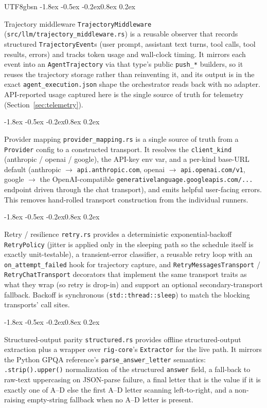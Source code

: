 \documentclass{article}
\makeatletter
\renewcommand{\subsection}{\@startsection{subsection}{2}{\z@}%
  {-1.8ex \@plus -0.5ex \@minus -0.2ex}{0.8ex \@plus 0.2ex}%
  {\normalsize\bfseries\raggedright\color{accent}}}
\makeatother
\begin{document}
\begin{CJK}{UTF8}{gbsn}
\subsection{Trajectory middleware}
\texttt{TrajectoryMiddleware} (\texttt{src/llm/trajectory\_middleware.rs}) is a
reusable observer that records structured \texttt{TrajectoryEvent}s (user prompt,
assistant text turns, tool calls, tool results, errors) and tracks token usage and
wall-clock timing. It mirrors each event into an \texttt{AgentTrajectory} via that
type's public \texttt{push\_*} builders, so it reuses the trajectory storage rather
than reinventing it, and its output is in the exact \texttt{agent\_execution.json}
shape the orchestrator reads back with no adapter. API-reported usage captured here
is the single source of truth for telemetry (Section~\ref{sec:telemetry}).

\subsection{Provider mapping}
\texttt{provider\_mapping.rs} is a single source of truth from a \texttt{Provider}
config to a constructed transport. It resolves the \texttt{client\_kind} (anthropic /
openai / google), the API-key env var, and a per-kind base-URL default (anthropic
$\rightarrow$ \texttt{api.anthropic.com}, openai $\rightarrow$
\texttt{api.openai.com/v1}, google $\rightarrow$ the OpenAI-compatible
\texttt{generativelanguage.googleapis.com/...} endpoint driven through the chat
transport), and emits helpful user-facing errors. This removes hand-rolled transport
construction from the individual runners.

\subsection{Retry / resilience}
\texttt{retry.rs} provides a deterministic exponential-backoff \texttt{RetryPolicy}
(jitter is applied only in the sleeping path so the schedule itself is exactly
unit-testable), a transient-error classifier, a reusable retry loop with an
\texttt{on\_attempt\_failed} hook for trajectory capture, and
\texttt{RetryMessagesTransport} / \texttt{RetryChatTransport} decorators that
implement the same transport traits as what they wrap (so retry is drop-in) and
support an optional secondary-transport fallback. Backoff is synchronous
(\texttt{std::thread::sleep}) to match the blocking transports' call sites.

\subsection{Structured-output parity}
\texttt{structured.rs} provides offline structured-output extraction plus a wrapper
over \texttt{rig-core}'s \texttt{Extractor} for the live path. It mirrors the Python
GPQA reference's \texttt{parse\_answer\_letter} semantics:
\texttt{.strip().upper()} normalization of the structured \texttt{answer} field, a
fall-back to raw-text uppercasing on JSON-parse failure, a final letter that is the
value if it is exactly one of A--D else the first A--D letter scanning
left-to-right, and a non-raising empty-string fallback when no A--D letter is
present.


\end{CJK}
\end{document}
